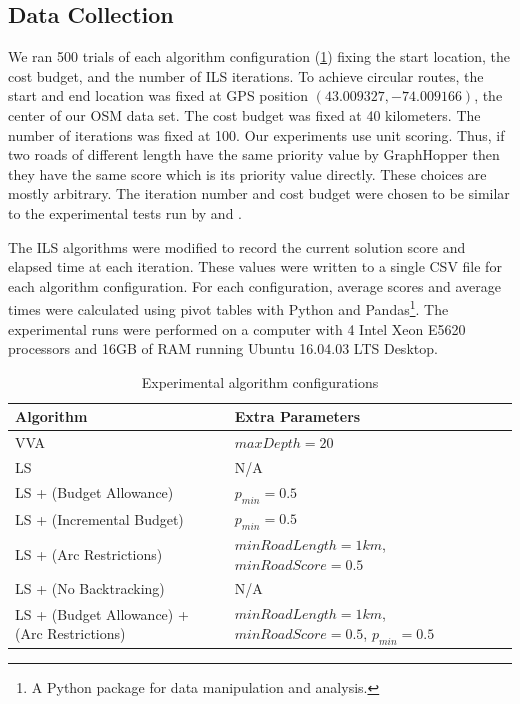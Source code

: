 \documentclass[honors]{union-cs-thesis}
\begin{document}
\subsection{Data Collection}
We ran 500 trials of each algorithm configuration (\cref{tab:algo-configs}) fixing the start location, the cost budget, and the number of ILS iterations. To achieve circular routes, the start and end location was fixed at GPS position $(43.009327, -74.009166)$, the center of our OSM data set. The cost budget was fixed at 40 kilometers. The number of iterations was fixed at 100. Our experiments use unit scoring. Thus, if two roads of different length have the same priority value by GraphHopper then they have the same score which is its priority value directly. These choices are mostly arbitrary. The iteration number and cost budget were chosen to be similar to the experimental tests run by \citeauthor{verbeeck2014extension} and \citeauthor{lu2015arc}.

The ILS algorithms were modified to record the current solution score and elapsed time at each iteration. These values were written to a single CSV file for each algorithm configuration. For each configuration, average scores and average times were calculated using pivot tables with Python and Pandas\footnote{A Python package for data manipulation and analysis.}. The experimental runs were performed on a computer with 4 Intel Xeon E5620 processors and 16GB of RAM running Ubuntu 16.04.03 LTS Desktop.

\begin{table}
\begin{center}
\begin{tabular}{|l|l|}
\hline
\textbf{Algorithm} & \textbf{Extra Parameters} \\
\hline
VVA & $maxDepth=20$ \\
\hline
LS & N/A \\
\hline
LS + (Budget Allowance) & $p_{min}=0.5$ \\
\hline
LS + (Incremental Budget) & $p_{min}=0.5$ \\
\hline
LS + (Arc Restrictions) & $minRoadLength=1km$, $minRoadScore=0.5$  \\
\hline
LS + (No Backtracking) & N/A \\
\hline
LS + (Budget Allowance) + (Arc Restrictions) & $minRoadLength=1km$, $minRoadScore=0.5$, $p_{min}=0.5$   \\
\hline
\end{tabular}
\end{center}
\caption{Experimental algorithm configurations}
\label{tab:algo-configs}
\end{table}
\end{document}
